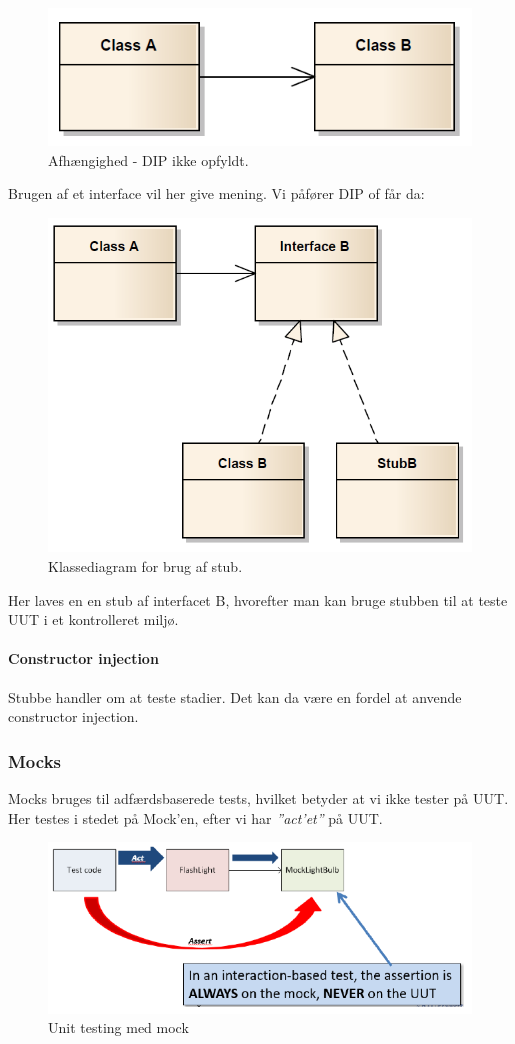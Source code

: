 \begin{figure}[H]
	\centering
	\includegraphics[width=0.5\linewidth]{figs/stubNoInterface.PNG}
	\caption{Afhængighed - DIP ikke opfyldt.}
	\label{fig:stubNoInterface}
\end{figure}

Brugen af et interface vil her give mening. Vi påfører DIP of får da:

\begin{figure}[H]
	\centering
	\includegraphics[width=0.55\linewidth]{figs/stubInterface.PNG}
	\caption{Klassediagram for brug af stub.}
	\label{fig:stubInterface}
\end{figure}

Her laves en en stub af interfacet B, hvorefter man kan bruge stubben til at teste UUT i et kontrolleret miljø.

\paragraph{Constructor injection}
Stubbe handler om at teste stadier. Det kan da være en fordel at anvende constructor injection.

\subsubsection{Mocks}
Mocks bruges til adfærdsbaserede tests, hvilket betyder at vi ikke tester på UUT. Her testes i stedet på Mock'en, efter vi har \textit{''act'et''} på UUT.

\begin{figure}[H]
\centering
\includegraphics[width=0.9\linewidth]{figs/mockTest.PNG}
\caption{Unit testing med mock}
\label{fig:mockTest}
\end{figure}

